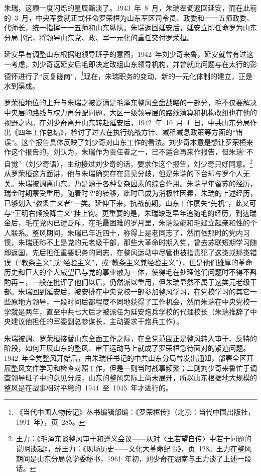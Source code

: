 朱瑞，这颗一度闪烁的星辰黯淡了。1943~年~8~月，朱瑞奉调返回延安，而在此前的~3~月，中央军委就正式任命罗荣桓为山东军区司令员、政委和一一五师政委、代师长，统一指挥一一五师和山东纵队。朱瑞返回延安后，延安立即任命罗为山东分局书记，将领导山东党、政、军一元化的重任交付罗荣桓。

延安早有调整山东根据地领导班子的意图，1942~年刘少奇来鲁，延安就曾有过这一考虑，刘少奇返延安后毛即决定改组山东领导机构，并曾就此问题与在太行的彭德怀进行了“反复磋商”，\footnote{《当代中国人物传记》丛书编辑部编：《罗荣桓传》（北京：当代中国出版社，1991~年），页~285。}现在，朱瑞职务的变动，新的一元化体制的建立，正是水到渠成。

罗荣桓地位的上升与朱瑞之被贬谪是毛泽东整风全盘战略的一部分，毛不仅要解决中央层的路线与权力再分配问题，大区一级领导层的路线清算和机构改组也在他的视野之内。在刘少奇离开山东转赴延安后，1942~年~10~月~1~日，中共山东分局作出《四年工作总结》，检讨了过去在执行统战方针、减租减息政策等方面的“错误”。这个报告具体反映了刘少奇对山东工作的看法。刘少奇本意是想让罗荣桓来作这个报告的，刘认为，朱瑞作为责任者之一，已不适合再来作报告，但朱瑞“不自觉”（刘少奇语），主动接过刘少奇的话，要求作这个报告，刘少奇只好同意。\footnote{王力：《毛泽东谈整风审干和遵义会议——从对〈王若望自传〉中若干问题的说明谈起》，载王力：《现场历史——文化大革命纪事》，页~128。王力在整风期间是山东分局总学委秘书，1961~年初，刘少奇在湖南与王力谈了上述一段话。}从罗荣桓这方面讲，他与朱瑞确实存在意见分歧，但是朱瑞的下台却与罗个人无关。朱瑞被调离山东，乃是源于各种复杂因素的综合作用。朱瑞早年留苏的经历，瑞金时期蒙受重用，随着时空的转移，此时已成为消极性因素，朱瑞的上述经历，已够划入“教条主义者”一类。延伸下来，抗战前期，山东工作屡失“先机”，此又可与“王明右倾投降主义”挂上钩。更重要的是，朱瑞缺乏早年追随毛的经历，到达瑞金后，毛在党内已遭贬斥，在毛最困难的岁月里，朱瑞没能和毛建立起亲和性的个人联系。整风期间，朱瑞已年近四十，称得上是老同志了，然而依那时的党内习惯，朱瑞还称不上是党的元老级干部，那些大革命时期入党，曾去苏联短期学习随即返国，先后担任重要职务的同志，在整风运动中尽管也被指责犯了这类或那类错误（“教条主义”或“经验主义”，或“教条主义兼经验主义”），但是他们雄厚的革命历史和巨大的个人威望已与党的事业融为一体，使得毛在处理他们问题时不得不斟酌再三，一般在批评了他们以后，仍然派以重用，但朱瑞显然不属于这类元老级干部。朱瑞回到延安后，被安排在中央党校一部参加整风学习，在党校学习的其它一些原地方领导，一段时间后都程度不同地获得了工作机会，然而朱瑞在中央党校一学就是两年，直至中共七大后才被派任为延安炮兵学校的代理校长（朱瑞推辞了中央建议他担任的军委副总参谋长，主动要求干炮兵工作）。

朱瑞被调、罗荣桓接替山东全面工作之际，在全党范围正是整风转入审干、反特的阶段，如何开展山东的整风、审干运动马上就成了罗荣桓急待面对的紧迫问题。1942~年全党整风开始后，由朱瑞任书记的中共山东分局曾发出通知，部署全区开展整风文件学习和检查对照工作，但是一则当时战事频繁；二则刘少奇来鲁忙于调查领导班子中的意见分歧，山东的整风实际上尚未展开，所以山东根据地大规模的整风是在战事相对平稳的~1944~至~1945~年才进行的。

